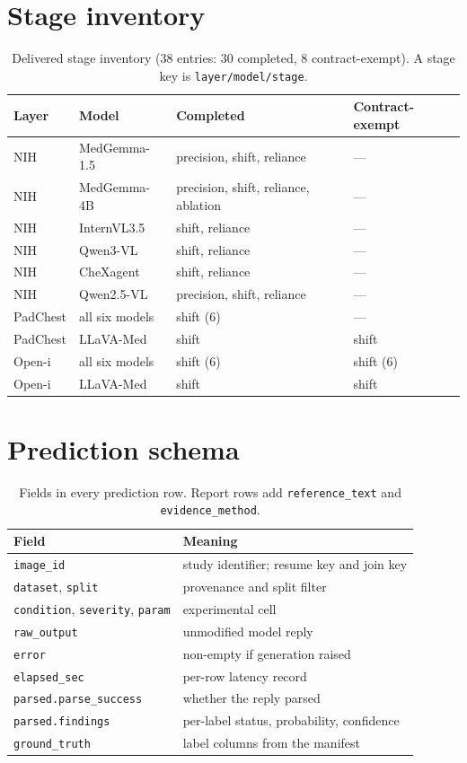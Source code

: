 \section{Stage inventory}
\label{app:stages}

\begin{table}[H]
\centering
\footnotesize
\setlength{\tabcolsep}{3pt}
\caption{Delivered stage inventory (38 entries: 30 completed, 8 contract-exempt). A stage key is \texttt{layer/model/stage}.}
\label{tab:stages}
\begin{tabular}{llll}
\toprule
Layer & Model & Completed & Contract-exempt \\
\midrule
NIH & MedGemma-1.5 & precision, shift, reliance & --- \\
NIH & MedGemma-4B & precision, shift, reliance, ablation & --- \\
NIH & InternVL3.5 & shift, reliance & --- \\
NIH & Qwen3-VL & shift, reliance & --- \\
NIH & CheXagent & shift, reliance & --- \\
NIH & Qwen2.5-VL & precision, shift, reliance & --- \\
PadChest & all six models & shift (6) & --- \\
PadChest & LLaVA-Med & shift & shift \\
Open-i & all six models & shift (6) & shift (6) \\
Open-i & LLaVA-Med & shift & shift \\
\bottomrule
\end{tabular}
\end{table}

\section{Prediction schema}
\label{app:schema}

\begin{table}[H]
\centering
\small
\caption{Fields in every prediction row. Report rows add \texttt{reference\_text} and \texttt{evidence\_method}.}
\label{tab:schema}
\begin{tabular}{ll}
\toprule
Field & Meaning \\
\midrule
\texttt{image\_id} & study identifier; resume key and join key \\
\texttt{dataset}, \texttt{split} & provenance and split filter \\
\texttt{condition}, \texttt{severity}, \texttt{param} & experimental cell \\
\texttt{raw\_output} & unmodified model reply \\
\texttt{error} & non-empty if generation raised \\
\texttt{elapsed\_sec} & per-row latency record \\
\texttt{parsed.parse\_success} & whether the reply parsed \\
\texttt{parsed.findings} & per-label status, probability, confidence \\
\texttt{ground\_truth} & label columns from the manifest \\
\bottomrule
\end{tabular}
\end{table}

